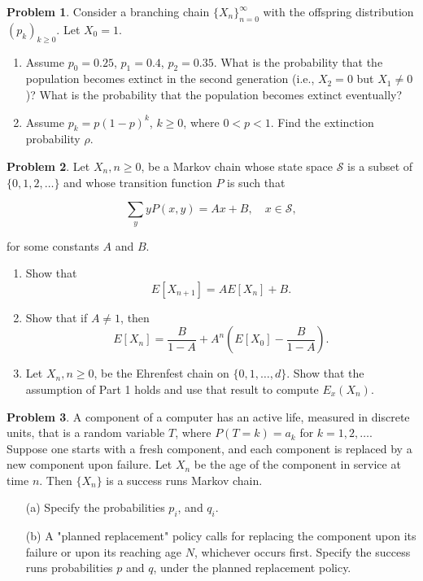 \documentclass[12pt]{extreport}
\theoremstyle{definition}
\newtheorem{prob}{Problem}
\begin{document}
        \begin{prob}
Consider a branching chain $\{X_n\}_{n=0}^{\infty}$ with the offspring distribution $(p_k)_{k \geq 0}$. Let $X_0 = 1$.

\begin{enumerate}
    \item Assume $p_0 = 0.25$, $p_1 = 0.4$, $p_2 = 0.35$. What is the probability that the population becomes extinct in the second generation (i.e., $X_2 = 0$ but $X_1 \neq 0$)? What is the probability that the population becomes extinct eventually?
    
    \item Assume $p_k = p(1 - p)^k$, $k \geq 0$, where $0 < p < 1$. Find the extinction probability $\rho$.
\end{enumerate}
    \end{prob}

    \vspace{0.2cm}
    \begin{prob}
Let $X_n, n \geq 0$, be a Markov chain whose state space $\mathcal{S}$ is a subset of $\{0,1,2,\dots\}$ and whose transition function $P$ is such that

\[
\sum_y y P(x, y) = A x + B, \quad x \in \mathcal{S},
\]

for some constants $A$ and $B$.

\begin{enumerate}
    \item Show that 
    \[
    E [X_{n+1}] = A E [X_n] + B.
    \]
    
    \item Show that if $A \neq 1$, then
    \[
    E [X_n] = \frac{B}{1 - A} + A^n \left( E [X_0] - \frac{B}{1 - A} \right).
    \]
    
    \item Let $X_n, n \geq 0$, be the Ehrenfest chain on $\{0, 1, \dots, d\}$. Show that the assumption of Part 1 holds and use that result to compute $E_x(X_n)$.
\end{enumerate}
    \end{prob}
    \begin{prob}
        A component of a computer has an active life, measured in discrete units, that is a random variable \(T\), where \(P(T = k) = a_k\) for \(k = 1, 2, \dots \). Suppose one starts with a fresh component, and each component is replaced by a new component upon failure. Let \(X_n\) be the age of the component in service at time \(n\). Then \(\{X_n\}\) is a success runs Markov chain.
    \begin{itemize}
        \item[(a)] Specify the probabilities \(p_i\), and \(q_i\).
        \item[(b)] A "planned replacement" policy calls for replacing the component upon its failure or upon its reaching age \(N\), whichever occurs first. Specify the success runs probabilities \(p\) and \(q\), under the planned replacement policy. 
    \end{itemize} 
    \end{prob}
\end{document}
